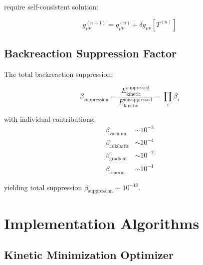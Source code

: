 \documentclass[12pt,a4paper]{article}
\begin{document}
require self-consistent solution:

\begin{equation}
g_{\mu\nu}^{(n+1)} = g_{\mu\nu}^{(n)} + \delta g_{\mu\nu}[T^{(n)}]
\end{equation}

\subsection{Backreaction Suppression Factor}

The total backreaction suppression:

\begin{equation}
\beta_{\text{suppression}} = \frac{E_{\text{kinetic}}^{\text{suppressed}}}{E_{\text{kinetic}}^{\text{unsuppressed}}} = \prod_i \beta_i
\end{equation}

with individual contributions:
\begin{align}
\beta_{\text{vacuum}} &\sim 10^{-3} \\
\beta_{\text{adiabatic}} &\sim 10^{-4} \\
\beta_{\text{gradient}} &\sim 10^{-2} \\
\beta_{\text{renorm}} &\sim 10^{-1}
\end{align}

yielding total suppression $\beta_{\text{suppression}} \sim 10^{-10}$.

\section{Implementation Algorithms}

\subsection{Kinetic Minimization Optimizer}
\end{document}
